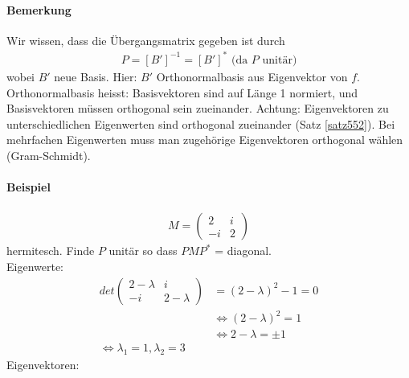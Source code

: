 \paragraph{Bemerkung} Wir wissen, dass die Übergangsmatrix gegeben ist durch
\begin{align}
P = [B']^{-1} = [B']^{*} \text{ (da $P$ unitär)}
\end{align}
wobei $B'$ neue Basis. Hier: $B'$ Orthonormalbasis aus Eigenvektor von $f$. Orthonormalbasis heisst: Basisvektoren sind auf Länge 1 normiert, und Basisvektoren müssen orthogonal sein zueinander.
Achtung: Eigenvektoren zu unterschiedlichen Eigenwerten sind orthogonal zueinander (Satz \ref{satz552}).
Bei mehrfachen Eigenwerten muss man zugehörige Eigenvektoren orthogonal wählen (Gram-Schmidt).

\paragraph{Beispiel}
\begin{align}
M = \begin{pmatrix} 2 & i \\ -i & 2\end{pmatrix}
\end{align}
hermitesch. Finde $P$ unitär so dass $PMP^{*}$ = diagonal.\\
Eigenwerte:
\begin{align}
det \begin{pmatrix} 2- \lambda & i \\ -i & 2-\lambda\end{pmatrix} &= (2 - \lambda)^2 -1 = 0 \\
&\Leftrightarrow (2- \lambda)^2 = 1 \\
&\Leftrightarrow 2- \lambda = \pm 1 \\
\Leftrightarrow \lambda_1 = 1, \lambda_2 = 3
\end{align}
Eigenvektoren:
